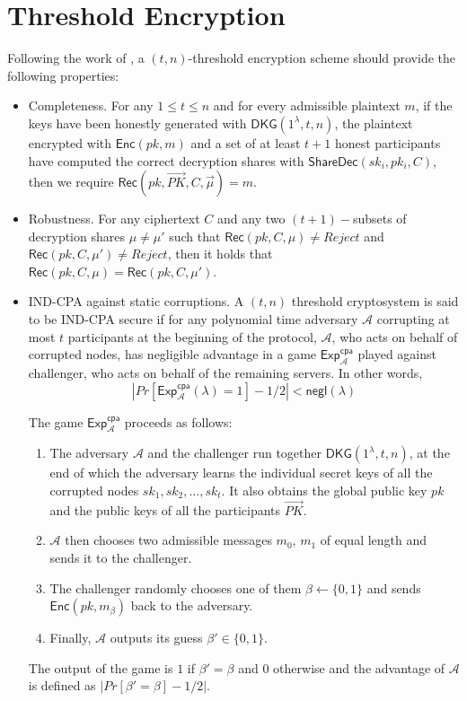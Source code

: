 \documentclass[letterpaper,twocolumn,10pt]{article}
\theoremstyle{definition}
\theoremstyle{remark}
\begin{document}
\section{Threshold Encryption}
\label{appendix:thresholdEnc}
Following the work of \cite{cortier2013distributed}, a $(t, n)$-threshold encryption scheme should provide the following properties:
\begin{itemize}
    \item Completeness. For any $1\le t\le n$ and for every admissible plaintext $m$, if the keys have been honestly generated with $\mathsf{DKG}(1^\lambda, t, n)$, the plaintext encrypted with $\mathsf{Enc}(pk, m)$ and a set of at least $t + 1$ honest participants have computed the correct decryption shares with $\mathsf{ShareDec}(sk_i, pk_i, C)$, then we require $\mathsf{Rec}(pk, \vec{PK}, C, \vec{\mu} ) = m$.
    \item Robustness. For any ciphertext $C$ and any two $(t + 1)-$subsets of decryption shares $\mu \ne \mu'$ such that $\mathsf{Rec}(pk, C, \mu) \ne {Reject}$ and $\mathsf{Rec}(pk, C, \mu') \ne {Reject}$, then it holds that $\mathsf{Rec}(pk, C, \mu) = \mathsf{Rec}(pk, C, \mu')$.
    \item IND-CPA against static corruptions. A $(t, n)$ threshold cryptosystem is said to be IND-CPA secure if for any polynomial time adversary $\mathcal{A}$ corrupting at most $t$ participants at the beginning of the protocol, $\mathcal{A}$, who acts on behalf of corrupted nodes, has negligible advantage in a game $\mathsf{Exp}^{\mathsf{cpa}}_{\mathcal{A}}$ played against challenger, who acts on behalf of the remaining servers. In other words,
    $$|Pr[\mathsf{Exp}_{\mathcal{A}}^{\mathsf{cpa}}(\lambda) = 1] - 1/2| < \mathsf{negl}(\lambda)$$
    
    The game $\mathsf{Exp}^{\mathsf{cpa}}_{\mathcal{A}}$ proceeds as follows:
    \begin{enumerate}
        \item The adversary $\mathcal{A}$ and the challenger run together $\mathsf{DKG}(1^\lambda, t, n)$, at the end of which the adversary learns the individual secret keys of all the corrupted nodes $sk_1, sk_2, \ldots, sk_t$. It also obtains the global public key $pk$ and the public keys of all the participants $\vec{PK}$.
        \item $\mathcal{A}$ then chooses two admissible messages $m_0$, $m_1$ of equal length and sends it to the challenger.
        \item The challenger randomly chooses one of them $\beta \leftarrow \{0, 1\}$ and sends $\mathsf{Enc}(pk, m_{\beta})$ back to the adversary.
        \item Finally, $\mathcal{A}$ outputs its guess $\beta' \in \{0,1\}$.
    \end{enumerate}
    The output of the game is $1$ if $\beta' = \beta$ and $0$ otherwise and the advantage of $\mathcal{A}$ is defined as $|Pr[\beta' = \beta] - 1/2|$.
\end{itemize}
\end{document}
